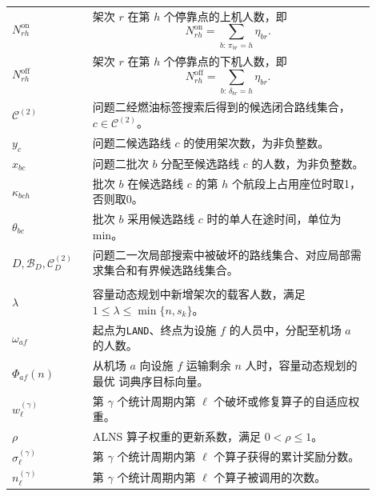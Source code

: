 \documentclass[UTF8,a4paper,zihao=5]{ctexart}
\begin{document}
\begin{longtable}{
    >{\centering\arraybackslash}p{0.20\linewidth}
    p{0.70\linewidth}
}
$N_{rh}^{\mathrm{on}}$
& 架次 $r$ 在第 $h$ 个停靠点的上机人数，即
\[
N_{rh}^{\mathrm{on}}=\sum_{b:\,\pi_{br}=h}\eta_{br}.
\] \\

$N_{rh}^{\mathrm{off}}$
& 架次 $r$ 在第 $h$ 个停靠点的下机人数，即
\[
N_{rh}^{\mathrm{off}}=\sum_{b:\,\delta_{br}=h}\eta_{br}.
\] \\

$\mathcal C^{(2)}$
& 问题二经燃油标签搜索后得到的候选闭合路线集合，$c\in\mathcal C^{(2)}$。 \\

$y_c$
& 问题二候选路线 $c$ 的使用架次数，为非负整数。 \\

$x_{bc}$
& 问题二批次 $b$ 分配至候选路线 $c$ 的人数，为非负整数。 \\

$\kappa_{bch}$
& 批次 $b$ 在候选路线 $c$ 的第 $h$ 个航段上占用座位时取1，否则取0。 \\

$\theta_{bc}$
& 批次 $b$ 采用候选路线 $c$ 时的单人在途时间，单位为 min。 \\

$D,\mathcal B_D,\mathcal C_D^{(2)}$
& 问题二一次局部搜索中被破坏的路线集合、对应局部需求集合和有界候选路线集合。 \\

\midrule
\multicolumn{2}{l}{\textbf{问题一辅助函数与ALNS算法变量}} \\[2pt]

$\lambda$
& 容量动态规划中新增架次的载客人数，满足
$1\leq\lambda\leq\min\{n,s_k\}$。 \\

$\omega_{af}$
& 起点为\texttt{LAND}、终点为设施 $f$ 的人员中，分配至机场 $a$ 的人数。 \\

$\Phi_{af}(n)$
& 从机场 $a$ 向设施 $f$ 运输剩余 $n$ 人时，容量动态规划的最优
词典序目标向量。 \\

$w_{\ell}^{(\gamma)}$
& 第 $\gamma$ 个统计周期内第 $\ell$ 个破坏或修复算子的自适应权重。 \\

$\rho$
& ALNS 算子权重的更新系数，满足 $0<\rho\leq 1$。 \\

$\sigma_{\ell}^{(\gamma)}$
& 第 $\gamma$ 个统计周期内第 $\ell$ 个算子获得的累计奖励分数。 \\

$n_{\ell}^{(\gamma)}$
& 第 $\gamma$ 个统计周期内第 $\ell$ 个算子被调用的次数。 \\[2pt]


\end{longtable}
\end{document}
